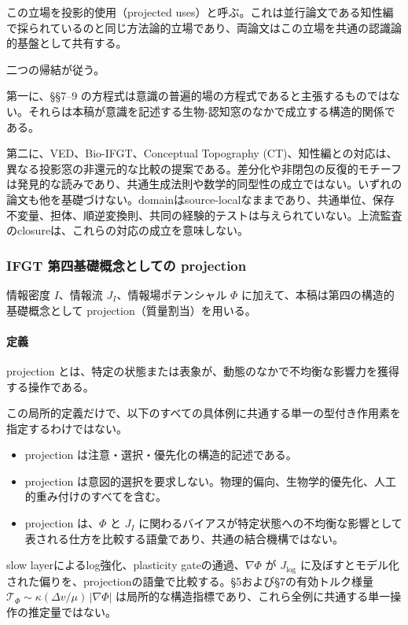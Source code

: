 この立場を投影的使用（projected uses）と呼ぶ。これは並行論文である知性編 \cite{Intelligence} で採られているのと同じ方法論的立場であり、両論文はこの立場を共通の認識論的基盤として共有する。

二つの帰結が従う。

第一に、§§7--9 の方程式は意識の普遍的場の方程式であると主張するものではない。それらは本稿が意識を記述する生物-認知窓のなかで成立する構造的関係である。

第二に、VED、Bio-IFGT、Conceptual Topography (CT)、知性編との対応は、異なる投影窓の非還元的な比較の提案である。差分化や非閉包の反復的モチーフは発見的な読みであり、共通生成法則や数学的同型性の成立ではない。いずれの論文も他を基礎づけない。domainはsource-localなままであり、共通単位、保存不変量、担体、順逆変換則、共同の経験的テストは与えられていない。上流監査のclosureは、これらの対応の成立を意味しない。

\subsubsection{IFGT 第四基礎概念としての projection}
\label{sec:projection-definition}

情報密度 $I$、情報流 $J_I$、情報場ポテンシャル $\Phi$ に加えて、本稿は第四の構造的基礎概念として projection（質量割当）を用いる。

\paragraph{定義}
projection とは、特定の状態または表象が、動態のなかで不均衡な影響力を獲得する操作である。

この局所的定義だけで、以下のすべての具体例に共通する単一の型付き作用素を指定するわけではない。

\begin{itemize}
\item projection は注意・選択・優先化の構造的記述である。
\item projection は意図的選択を要求しない。物理的偏向、生物学的優先化、人工的重み付けのすべてを含む。
\item projection は、$\Phi$ と $J_I$ に関わるバイアスが特定状態への不均衡な影響として表される仕方を比較する語彙であり、共通の結合機構ではない。
\end{itemize}

slow layerによるlog強化、plasticity gateの通過、$\nabla\Phi$ が $J_{\log}$ に及ぼすとモデル化された偏りを、projectionの語彙で比較する。§5および§7の有効トルク様量 $\mathcal{T}_{\Phi} \sim \kappa (\Delta v / \mu)\,|\nabla\Phi|$ は局所的な構造指標であり、これら全例に共通する単一操作の推定量ではない。

